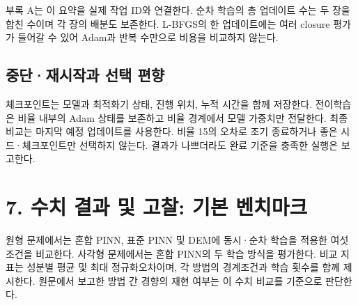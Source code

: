 \documentclass[10pt,a4paper]{article}
\begin{document}
부록 A는 이 요약을 실제 작업 ID와 연결한다. 순차 학습의 총 업데이트 수는 두 장을 합친 수이며 각 장의 배분도 보존한다. L-BFGS의 한 업데이트에는 여러 closure 평가가 들어갈 수 있어 Adam과 반복 수만으로 비용을 비교하지 않는다.\par

\subsection{중단·재시작과 선택 편향}

체크포인트는 모델과 최적화기 상태, 진행 위치, 누적 시간을 함께 저장한다. 전이학습은 비율 내부의 Adam 상태를 보존하고 비율 경계에서 모델 가중치만 전달한다. 최종 비교는 마지막 예정 업데이트를 사용한다. 비율 15의 오차로 조기 종료하거나 좋은 시드·체크포인트만 선택하지 않는다. 결과가 나쁘더라도 완료 기준을 충족한 실행은 보고한다.\par

\clearpage

\section{7. 수치 결과 및 고찰: 기본 벤치마크}

원형 문제에서는 혼합 PINN, 표준 PINN 및 DEM에 동시·순차 학습을 적용한 여섯 조건을 비교한다. 사각형 문제에서는 혼합 PINN의 두 학습 방식을 평가한다. 비교 지표는 성분별 평균 및 최대 정규화오차이며, 각 방법의 경계조건과 학습 횟수를 함께 제시한다. 원문에서 보고한 방법 간 경향의 재현 여부는 이 수치 비교를 기준으로 판단한다.\par

\begingroup\small
\end{document}
